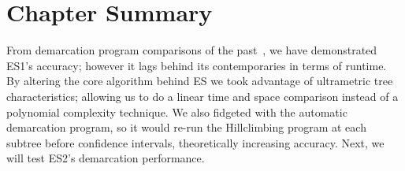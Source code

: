 %
%
%
%


\section{Chapter Summary}
From demarcation program comparisons of the past~\cite{carlo}, we have demonstrated ES1's accuracy; however it lags behind its contemporaries in terms of runtime.
By altering the core algorithm behind ES we took advantage of ultrametric tree characteristics; allowing us to do a linear time and space comparison instead of a polynomial complexity technique.
We also fidgeted with the automatic demarcation program, so it would re-run the Hillclimbing program at each subtree before confidence intervals, theoretically increasing accuracy.
Next, we will test ES2's demarcation performance.

